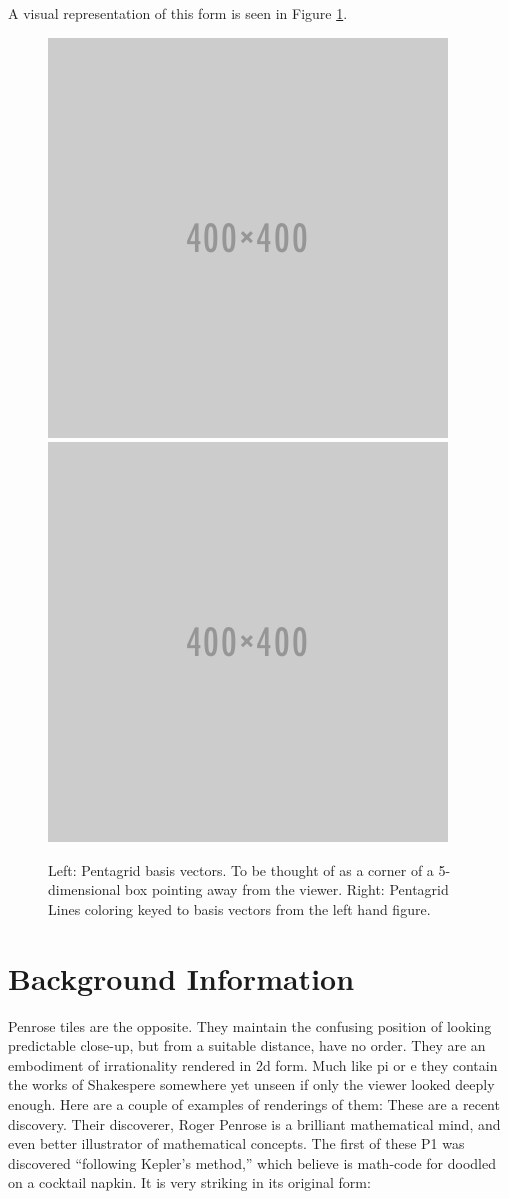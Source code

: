 \documentclass{amsart}
\begin{document}
A visual representation of this form is seen in Figure \ref{fig:pentagrid-basis}.

\begin{figure}[h]
  \centering
  \includegraphics[width=0.4\linewidth]{figures/placeholder}
  \includegraphics[width=0.4\linewidth]{figures/placeholder}
  \caption{Left: Pentagrid basis vectors. To be thought of as a corner of a 5-dimensional box pointing away from the viewer.  Right: Pentagrid Lines coloring keyed to basis vectors from the left hand figure.}
  \label{fig:pentagrid-basis}
\end{figure}



\section{Background Information}

Penrose tiles are the opposite. They maintain the confusing position of looking predictable close-up, but 
from a suitable distance, have no order. They are an embodiment of irrationality rendered in 2d form. 
Much like pi or e they contain the works of Shakespere somewhere yet unseen if only the viewer looked deeply enough. Here are a couple of 
examples of renderings of them:
These are a recent discovery. Their discoverer, Roger Penrose is a brilliant mathematical mind, and 
even better illustrator of mathematical concepts. The first of these P1 was discovered “following Kepler’s method,”
which believe is math-code for doodled on a cocktail napkin. It is very striking in its original form:
\end{document}
